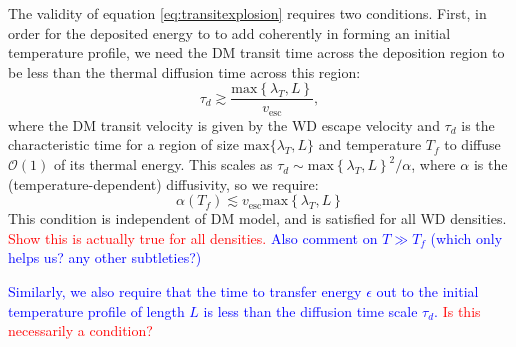 \documentclass[twocolumn,showpacs,preprintnumbers,amsmath,amssymb,prd]{revtex4}
\newcommand{\OO}{\mathcal{O}}
\begin{document}
The validity of equation \eqref{eq:transitexplosion} requires two conditions.  First, in order for the deposited energy to to add coherently in forming an initial temperature profile, we need the DM transit time across the deposition region to be less than the thermal diffusion time across this region:
\begin{equation}
\tau_d \gtrsim \frac{\text{max}\left\{ \lambda_T, L \right\}}{v_\text{esc}},
\end{equation}
where the DM transit velocity is given by the WD escape velocity and $\tau_d$ is the characteristic time for a region of size $\text{max}\{\lambda_T, L\}$ and temperature $T_f$ to diffuse $\OO(1)$ of its thermal energy.  This scales as $\tau_d \sim \text{max}\left\{ \lambda_T, L \right\}^2/\alpha$, where $\alpha$ is the (temperature-dependent) diffusivity, so we require:
\begin{equation}
\alpha\left(T_f\right) \lesssim v_\text{esc} \text{max}\left\{ \lambda_T, L \right\} \label{eq:SlowDiffusion}
\end{equation}
This condition is independent of DM model, and is satisfied for all WD densities.
\textcolor{red}{Show this is actually true for all densities.} \textcolor{blue}{Also comment on $T \gg T_f$ (which only helps us? any other subtleties?)}

\textcolor{blue}{Similarly, we also require that the time to transfer energy $\epsilon$ out to the initial temperature profile of length $L$ is less than the diffusion time scale $\tau_d$.} \textcolor{red}{Is this necessarily a condition?}
\end{document}
